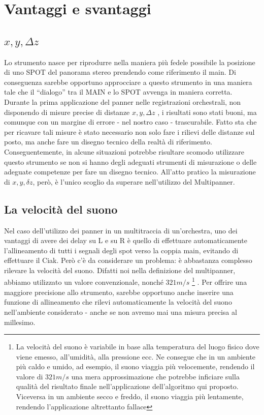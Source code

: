 \documentclass{article}
\begin{document}
\section{Vantaggi e svantaggi}

\subsection{$x, y, \Delta z$}
    Lo strumento nasce per riprodurre nella maniera più fedele possibile la posizione di uno SPOT del panorama stereo prendendo come riferimento il main. Di conseguenza sarebbe opportuno approcciare a questo strumento in una maniera tale che il ``dialogo'' tra il MAIN e lo SPOT avvenga in maniera corretta.
    Durante la prima applicazione del panner nelle registrazioni orchestrali, non disponendo di misure precise di distanze $x, y, \Delta z$ , i risultati sono stati buoni, ma comunque con un margine di errore - nel nostro caso - trascurabile.
    Fatto sta che per ricavare tali misure è stato necessario non solo fare i rilievi delle distanze sul posto, ma anche fare un disegno tecnico della realtà di riferimento. Conseguentemente, in alcune situazioni potrebbe risultare scomodo utilizzare questo strumento se non si hanno degli adeguati strumenti di misurazione o delle adeguate competenze per fare un disegno tecnico. All'atto pratico la misurazione di  $x, y, \delta z$, però, è l'unico scoglio da superare nell'utilizzo del Multipanner. 

\subsection{La velocità del suono}
    Nel caso dell'utilizzo dei panner in un multitraccia di un'orchestra, uno dei vantaggi di avere dei delay su L e su R è quello di effettuare automaticamente l'allineamento di tutti i segnali degli spot verso la coppia main, evitando di effettuare il Ciak. Però c'è da considerare un problema: è abbastanza complesso rilevare la velocità del suono. Difatti noi nella definizione del multipanner, abbiamo utilizzato un valore convenzionale, nonché $321 m/s$ \footnote{La velocità del suono è variabile in base alla temperatura del luogo fisico dove viene emesso, all'umidità, alla pressione ecc. Ne consegue che in un ambiente più caldo e umido, ad esempio, il suono viaggia più velocemente, rendendo il valore di $321 m/s$ una mera approssimazione che potrebbe inficiare sulla qualità del risultato finale nell'applicazione dell'algoritmo qui proposto. Viceversa in un ambiente secco e freddo, il suono viaggia più lentamente, rendendo l'applicazione altrettanto fallace} . Per offrire una maggiore precisione allo strumento, sarebbe opportuno anche inserire una funzione di allineamento che rilevi automaticamente la velocità del suono nell'ambiente considerato - anche se non avremo mai una misura precisa al millesimo.
    
\end{document}
